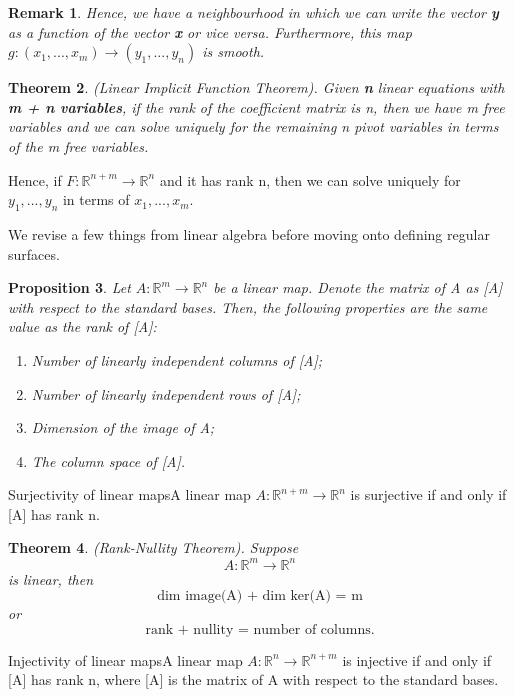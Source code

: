 \documentclass[twoside]{article}
\newcounter{lecnum}
\newtheorem{theorem}{Theorem}[lecnum]
\newtheorem{proposition}[theorem]{Proposition}
\newtheorem{remark}[theorem]{Remark}
\begin{document}
\begin{remark}
Hence, we have a neighbourhood in which we can write the vector \textbf{y} as a function of the vector \textbf{x} or vice versa. Furthermore, this map $g: (x_1,...,x_m) \rightarrow (y_1,...,y_n)$ is smooth.
\end{remark}

\begin{theorem}(Linear Implicit Function Theorem). Given \textbf{n} linear equations with \textbf{m + n variables}, if the rank of the coefficient matrix is n, then we have m free variables and we can solve uniquely for the remaining n pivot variables in terms of the m free variables.
\end{theorem}

Hence, if $F: \mathbb{R}^{n + m} \rightarrow \mathbb{R}^n$ and it has rank n, then we can solve uniquely for $y_1,...,y_n$ in terms of $x_1,...,x_m.$

We revise a few things from linear algebra before moving onto defining regular surfaces.

\begin{proposition}Let $A: \mathbb{R}^m \rightarrow \mathbb{R}^n$ be a linear map. Denote the matrix of A as [A] with respect to the standard bases. Then, the following properties are the same value as the rank of [A]:
\begin{enumerate}
    \item Number of linearly independent columns of [A];
    \item Number of linearly independent rows of [A];
    \item Dimension of the image of A;
    \item The column space of [A].
\end{enumerate}
\end{proposition}

\begin{proposition_exam}{Surjectivity of linear maps}{}A linear map $A: \mathbb{R}^{n+m} \rightarrow \mathbb{R}^n$ is surjective if and only if [A] has rank n.
\end{proposition_exam}

\begin{theorem}(Rank-Nullity Theorem). Suppose 
$$
A: \mathbb{R}^m \rightarrow \mathbb{R}^n
$$
is linear, then 
$$
\text{dim image(A) + dim ker(A) = m}
$$
or 
$$
\text{rank + nullity = number of columns.}
$$
\end{theorem}

\begin{proposition_exam}{Injectivity of linear maps}{}A linear map $A: \mathbb{R}^n \rightarrow \mathbb{R}^{n+m}$ is injective if and only if [A] has rank n, where [A] is the matrix of A with respect to the standard bases.
\end{proposition_exam}
\end{document}
